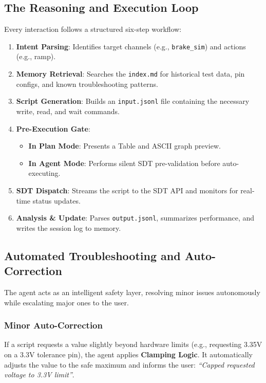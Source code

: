 \documentclass[conference]{IEEEtran}
\begin{document}
\subsection{The Reasoning and Execution Loop}
Every interaction follows a structured six-step workflow:
\begin{enumerate}
    \item \textbf{Intent Parsing}: Identifies target channels (e.g., \texttt{brake\_sim}) and actions (e.g., ramp).
    \item \textbf{Memory Retrieval}: Searches the \texttt{index.md} for historical test data, pin configs, and known troubleshooting patterns.
    \item \textbf{Script Generation}: Builds an \texttt{input.jsonl} file containing the necessary write, read, and wait commands.
    \item \textbf{Pre-Execution Gate}:
    \begin{itemize}
        \item \textbf{In Plan Mode}: Presents a Table and ASCII graph preview.
        \item \textbf{In Agent Mode}: Performs silent SDT pre-validation before auto-executing.
    \end{itemize}
    \item \textbf{SDT Dispatch}: Streams the script to the SDT API and monitors for real-time status updates.
    \item \textbf{Analysis \& Update}: Parses \texttt{output.jsonl}, summarizes performance, and writes the session log to memory.
\end{enumerate}

\subsection{Automated Troubleshooting and Auto-Correction}
The agent acts as an intelligent safety layer, resolving minor issues autonomously while escalating major ones to the user.
\subsubsection{Minor Auto-Correction}
If a script requests a value slightly beyond hardware limits (e.g., requesting 3.35V on a 3.3V tolerance pin), the agent applies \textbf{Clamping Logic}. It automatically adjusts the value to the safe maximum and informs the user: \textit{``Capped requested voltage to 3.3V limit''}.
\end{document}
